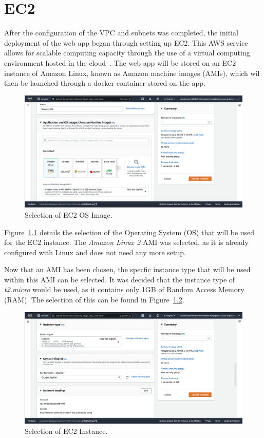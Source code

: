 \chapter{EC2}\label{ch:ec2}

After the configuration of the VPC and subnets was completed, the initial deployment of the web app began through
setting up EC2.
This AWS service allows for scalable computing capacity through the use of a virtual computing environment hosted in the
cloud~\citep{aws2022ec2}.
The web app will be stored on an EC2 instance of Amazon Linux, known as Amazon machine images (AMIs), which wil then be
launched through a docker container stored on the app.

\begin{figure}[!htbp]
    \centering
    \includegraphics[scale=0.3]{resources/ec2/create-instance-application-and-os-images}
    \caption{Selection of EC2 OS Image.}
    \label{fig:ec2-os}
\end{figure}

Figure~\ref{fig:ec2-os} details the selection of the Operating System (OS) that will be used for the EC2 instance.
The \textit{Amazon Linux 2} AMI was selected, as it is already configured with Linux and does not need any more setup.

\clearpage

Now that an AMI has been chosen, the specfic instance type that will be used within this AMI can be selected.
It was decided that the instance type of \textit{t2.micro} would be used, as it contains only 1GB of Random Access
Memory (RAM).
The selection of this can be found in Figure~\ref{fig:ec2-instance}.

\begin{figure}[!htbp]
    \centering
    \includegraphics[scale=0.3]{resources/ec2/create-instance-instance-type}
    \caption{Selection of EC2 Instance.}
    \label{fig:ec2-instance}
\end{figure}

